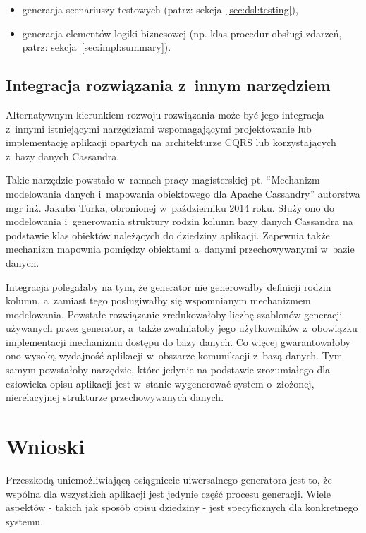 \begin{itemize}
 \item generacja scenariuszy testowych (patrz: sekcja~\ref{sec:dsl:testing}),
 \item generacja elementów logiki biznesowej (np. klas procedur obsługi zdarzeń, patrz: sekcja~\ref{sec:impl:summary}).
\end{itemize}


\subsection{Integracja rozwiązania z~innym narzędziem}

Alternatywnym kierunkiem rozwoju rozwiązania może być jego integracja z~innymi istniejącymi narzędziami wspomagającymi projektowanie lub implementację aplikacji opartych na architekturze CQRS lub korzystających z~bazy danych Cassandra.

Takie narzędzie powstało w~ramach pracy magisterskiej pt. ``Mechanizm modelowania danych i~mapowania obiektowego dla Apache Cassandry'' autorstwa mgr inż. Jakuba Turka, obronionej w~październiku 2014 roku.
Służy ono do modelowania i~generowania struktury rodzin kolumn bazy danych Cassandra na podstawie klas obiektów należących do dziedziny aplikacji.
Zapewnia także mechanizm mapownia pomiędzy obiektami a~danymi przechowywanymi w~bazie danych.

Integracja polegałaby na tym, że generator nie generowałby definicji rodzin kolumn, a~zamiast tego posługiwałby się wspomnianym mechanizmem modelowania.
Powstałe rozwiązanie zredukowałoby liczbę szablonów generacji używanych przez generator, a~także zwalniałoby jego użytkowników z~obowiązku implementacji mechanizmu dostępu do bazy danych.
Co więcej gwarantowałoby ono wysoką wydajność aplikacji w~obszarze komunikacji z~bazą danych.
Tym samym powstałoby narzędzie, które jedynie na podstawie zrozumiałego dla człowieka opisu aplikacji jest w~stanie wygenerować system o~złożonej, nierelacyjnej strukturze przechowywanych danych.



\section{Wnioski}

Przeszkodą uniemożliwiającą osiągniecie uiwersalnego generatora jest to, że wspólna dla wszystkich aplikacji jest jedynie część procesu generacji.
Wiele aspektów - takich jak sposób opisu dziedziny - jest specyficznych dla konkretnego systemu.


